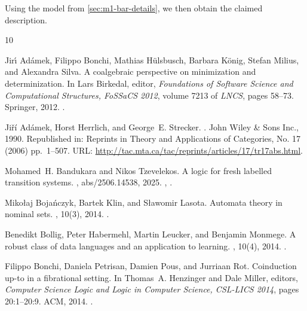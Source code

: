 \documentclass[11pt,a4paper]{amsart}
\newif\iffullversion
\theoremstyle{plain}
\numberwithin{equation}{section}
\newcommand{\+}[1]{\mathcal{#1}\xspace}
\theoremstyle{definition}
\begin{document}
Using the model from \cref{sec:m1-bar-details}, we then obtain the claimed description.


\fi %


\providecommand{\noopsort}[1]{}
\begin{thebibliography}{10}

Jir{\'{\i}} Ad{\'{a}}mek, Filippo Bonchi, Mathias H{\"{u}}lsbusch, Barbara
  K{\"{o}}nig, Stefan Milius, and Alexandra Silva.
\newblock A coalgebraic perspective on minimization and determinization.
\newblock In Lars Birkedal, editor, {\em Foundations of Software Science and
  Computational Structures, {FoSSaCS} 2012}, volume 7213 of {\em LNCS}, pages
  58--73. Springer, 2012.
\newblock \href {https://doi.org/10.1007/978-3-642-28729-9\_4}
  {}.

Ji{\v{r}\'i} Ad{\'a}mek, Horst Herrlich, and George~E. Strecker.
.
\newblock John Wiley \& Sons Inc., 1990.
\newblock Republished in: Reprints in Theory and Applications of Categories,
  No. 17 (2006) pp.~1--507.
\newblock URL: \url{http://tac.mta.ca/tac/reprints/articles/17/tr17abs.html}.

Mohamed~H. Bandukara and Nikos Tzevelekos.
\newblock A logic for fresh labelled transition systems.
, abs/2506.14538, 2025.
\newblock \href {https://arxiv.org/abs/2506.14538} {},
  \href {https://doi.org/10.48550/ARXIV.2506.14538}
  {}.

Miko{\l}aj Boja{\'n}czyk, Bartek Klin, and S{\l}awomir Lasota.
\newblock Automata theory in nominal sets.
, 10(3), 2014.
\newblock \href {https://doi.org/10.2168/LMCS-10(3:4)2014}
  {}.

Benedikt Bollig, Peter Habermehl, Martin Leucker, and Benjamin Monmege.
\newblock A robust class of data languages and an application to learning.
, 10(4), 2014.
\newblock \href {https://doi.org/10.2168/LMCS-10(4:19)2014}
  {}.

Filippo Bonchi, Daniela Petrisan, Damien Pous, and Jurriaan Rot.
\newblock Coinduction up-to in a fibrational setting.
\newblock In Thomas~A. Henzinger and Dale Miller, editors, {\em Computer
  Science Logic and Logic in Computer Science, {CSL-LICS} 2014}, pages
  20:1--20:9. {ACM}, 2014.
\newblock \href {https://doi.org/10.1145/2603088.2603149}
  {}.


\end{thebibliography}
\end{document}
